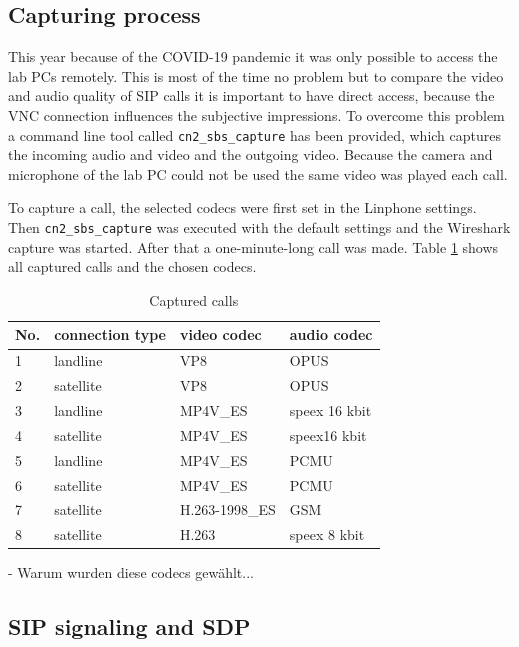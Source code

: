 \documentclass[parskip=full]{scrartcl}
\begin{document}
\subsection{Capturing process} \label{subsec:capture}
This year because of the COVID-19 pandemic it was only possible to access the lab PCs remotely.
This is most of the time no problem but to compare the video and audio quality of SIP calls it is important to have direct access, because the VNC connection influences the subjective impressions.
To overcome this problem a command line tool called \verb|cn2_sbs_capture| has been provided, which captures the incoming audio and video and the outgoing video.
Because the camera and microphone of the lab PC could not be used the same video was played each call.

To capture a call, the selected codecs were first set in the Linphone settings. 
Then \verb|cn2_sbs_capture| was executed with the default settings and the Wireshark capture was started. 
After that a one-minute-long call was made. 
Table \ref{tab:capture} shows all captured calls and the chosen codecs.

\begin{table}[hb]
	\centering
	\caption{Captured calls}
	\label{tab:capture}
	\begin{tabular}{l|l|l|l}
		\toprule
		\textbf{No.} & \textbf{connection type} & \textbf{video codec} & \textbf{audio codec}  \\ \midrule
		1 & landline & VP8 & OPUS\\
		2 & satellite & VP8 & OPUS\\
		3 & landline & MP4V\_ES & speex 16 kbit\\
		4 & satellite & MP4V\_ES & speex16 kbit\\
		5 & landline & MP4V\_ES & PCMU\\
		6 & satellite & MP4V\_ES & PCMU\\
		7 & satellite & H.263-1998\_ES & GSM\\
		8 & satellite & H.263 & speex 8 kbit\\
		\bottomrule
	\end{tabular}
\end{table}

- Warum wurden diese codecs gewählt...

\subsection{SIP signaling and SDP} \label{subsec:signaling}
\end{document}
